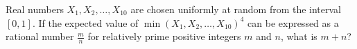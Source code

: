 Real numbers $X_1, X_2, \dots, X_{10}$ are chosen uniformly at random from the interval $[0,1]$. If the expected value of $\min(X_1,X_2,\dots, X_{10})^4$ can be expressed as a rational number $\frac{m}{n}$ for relatively prime positive integers $m$ and $n$, what is $m+n$?